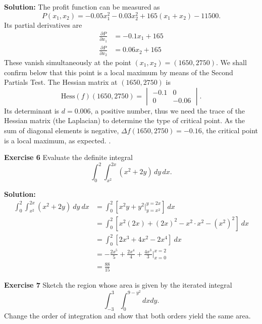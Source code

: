 \documentclass[12pt,oneside]{exam}
\newenvironment{exercise}[1]{\vspace{.1in}\noindent\textbf{Exercise #1 \hspace{.05em}}}{}
\newenvironment{newsolution}{\vspace{.1in}\noindent\textbf{Solution: \hspace{.05em}}}{}
\begin{document}
\begin{newsolution}
The profit function can be measured as 
\begin{equation*}
P(x_1,x_2) = -0.05x_{1}^{2}-0.03x_{2}^{2}+165(x_1+x_2)-11500.
\end{equation*}
Its partial derivatives are 
\begin{align*}
\frac{\partial P}{\partial x_1} & = -0.1x_1+165 \\
\frac{\partial P}{\partial x_2} & = 0.06x_2 + 165
\end{align*}
These vanish simultaneously at the point $(x_1,x_2) = (1650,2750)$. We shall confirm below that this point is a local maximum by means of the Second Partials Test. The Hessian matrix at $(1650,2750)$ is
\begin{equation*}
\mathrm{Hess}(f) (1650,2750)= 
\begin{vmatrix}
-0.1 & 0 \\
0 & -0.06
\end{vmatrix}.
\end{equation*}
Its determinant is $d=0.006$, a positive number, thus we need the trace of the Hessian matrix (the Laplacian) to determine the type of critical point. As the sum of diagonal elements is negative, $\Delta f (1650,2750) = -0.16$, the critical point is a local maximum, as expected. 
\end{newsolution}. 

\begin{exercise}{6}
Evaluate the definite integral
\begin{equation*}
\int_{0}^{2} \int_{x^2}^{2x} (x^2+2y) \, dy \, dx. 
\end{equation*}
\end{exercise}

\begin{newsolution}
\begin{align*}
\int_{0}^{2} \int_{x^2}^{2x} (x^2+2y)\ dy \ dx & = \int_{0}^{2} \left[ x^2y+y^2 \Big|_{y=x^2}^{y=2x} \right] \ dx \\
& = \int_{0}^{2} \left[x^2(2x)+(2x)^2-x^2\cdot x^2 - (x^2)^2 \right] \ dx \\
& = \int_{0}^{2} \left[ 2x^3+4x^2-2x^4\right] \ dx \\
& =  -\frac{2x^5}{5} + \frac{2x^4}{4} + \frac{4x^3}{3} \Big|_{x=0}^{x=2} \\
& = \frac{88}{15}
\end{align*}
\end{newsolution}

\begin{exercise}{7}
Sketch the region whose area is given by the iterated integral
\begin{equation*}
 \int_{-3}^{3} \int_{0}^{9-y^2} dx dy.
\end{equation*}
Change the order of integration and show that both orders yield the same area.
\end{exercise}
\end{document}
